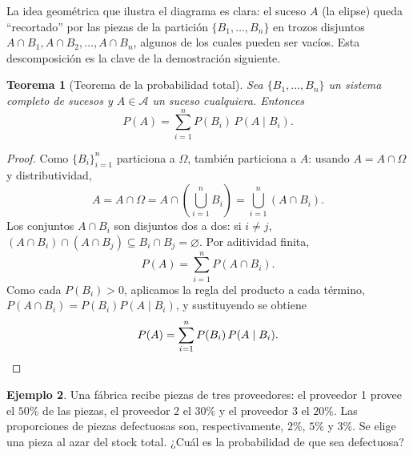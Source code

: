 \documentclass[11pt,a4paper]{article}
\theoremstyle{plain}
\newtheorem{teorema}{Teorema}[section]
\theoremstyle{definition}
\newtheorem{ejemplo}[teorema]{Ejemplo}
\theoremstyle{remark}
\begin{document}
\begin{center}
\end{center}

La idea geométrica que ilustra el diagrama es clara: el suceso $A$ (la elipse) queda ``recortado'' por las piezas de la partición $\{B_1,\dots,B_n\}$ en trozos disjuntos $A\cap B_1, A\cap B_2,\dots, A\cap B_n$, algunos de los cuales pueden ser vacíos. Esta descomposición es la clave de la demostración siguiente.

\begin{teorema}[Teorema de la probabilidad total]
Sea $\{B_1,\dots,B_n\}$ un sistema completo de sucesos y $A \in \mathcal{A}$ un suceso cualquiera. Entonces
\[
P(A) = \sum_{i=1}^{n} P(B_i)\, P(A\mid B_i).
\]
\end{teorema}

\begin{proof}
Como $\{B_i\}_{i=1}^n$ particiona a $\Omega$, también particiona a $A$: usando $A=A\cap\Omega$ y distributividad,
\[
A = A \cap \Omega = A \cap \left(\bigcup_{i=1}^n B_i\right) = \bigcup_{i=1}^n (A \cap B_i).
\]
Los conjuntos $A\cap B_i$ son disjuntos dos a dos: si $i\neq j$, $(A\cap B_i)\cap(A\cap B_j) \subseteq B_i\cap B_j = \varnothing$. Por aditividad finita,
\[
P(A) = \sum_{i=1}^n P(A\cap B_i).
\]
Como cada $P(B_i)>0$, aplicamos la regla del producto a cada término, $P(A\cap B_i) = P(B_i)P(A\mid B_i)$, y sustituyendo se obtiene
\[
P(A) = \sum_{i=1}^n P(B_i)\,P(A\mid B_i). \qedhere
\]
\end{proof}

\begin{ejemplo}
Una fábrica recibe piezas de tres proveedores: el proveedor 1 provee el $50\%$ de las piezas, el proveedor 2 el $30\%$ y el proveedor 3 el $20\%$. Las proporciones de piezas defectuosas son, respectivamente, $2\%$, $5\%$ y $3\%$. Se elige una pieza al azar del stock total. ¿Cuál es la probabilidad de que sea defectuosa?
\end{ejemplo}
\end{document}
